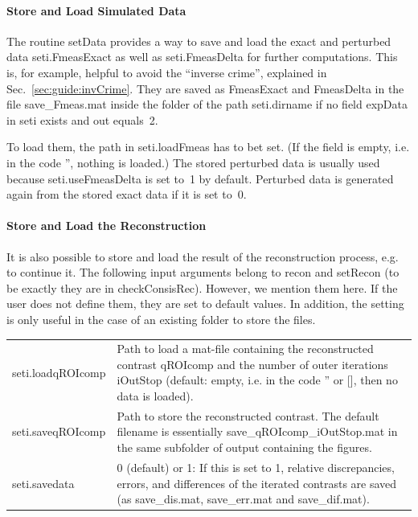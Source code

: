 \documentclass[a4paper]{article}
\begin{document}
\paragraph{Store and Load Simulated Data} The routine \textsf{setData} provides a way to save and load the exact and perturbed data \textsf{seti.FmeasExact} as well as \textsf{seti.FmeasDelta} for further computations. This is, for example, helpful to avoid the ``inverse crime'', explained in Sec.~\ref{sec:guide:invCrime}. 
%
They are saved as \textsf{FmeasExact} and \textsf{FmeasDelta} in the file \textsf{save\_Fmeas.mat} inside the folder of the path \textsf{seti.dirname} if no field \textsf{expData} in \textsf{seti} exists and \textsf{out} equals~2.

To load them, the path in \textsf{seti.loadFmeas} has to bet set. (If the field is empty, i.e. in the code \textsf{''}, nothing is loaded.) The stored perturbed data is usually used because \textsf{seti.useFmeasDelta} is set to~1 by default. Perturbed data is generated again from the stored exact data if it is set to~0.

\paragraph{Store and Load the Reconstruction} It is also possible to store and load the result of the reconstruction process, e.g. to continue it. The following input arguments belong to \textsf{recon} and \textsf{setRecon} (to be exactly they are in \textsf{checkConsisRec}). However, we mention them here. If the user does not define them, they are set to default values. In addition, the setting is only useful in the case of an existing folder to store the files.

\noindent\begin{tabular}[t]{p{2.8cm} p{12.8cm}}
\textsf{seti.loadqROIcomp} & Path to load a \textsf{mat}-file containing the reconstructed contrast \textsf{qROIcomp} and the number of outer iterations \textsf{iOutStop} (default: empty, i.e. in the code \textsf{''} or \textsf{[]}, then no data is loaded).\\
\textsf{seti.saveqROIcomp} & Path to store the reconstructed contrast. The default filename is essentially \textsf{save\_qROIcomp\_iOutStop.mat} in the same subfolder of \textsf{output} containing the figures.\\
\textsf{seti.savedata} & 0 (default) or 1: If this is set to 1, relative discrepancies, errors, and differences of the iterated contrasts are saved (as \textsf{save\_dis.mat}, \textsf{save\_err.mat} and \textsf{save\_dif.mat}).
\end{tabular}
\end{document}
